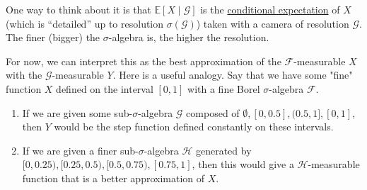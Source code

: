	One way to think about it is that $\mathbb{E}[X \mid \mathcal{G}]$ is the \hyperref[def:cond-exp]{conditional expectation} of $X$ (which is ``detailed'' up to resolution $\sigma(\mathcal{G})$) taken with a camera of resolution $\mathcal{G}$. The finer (bigger) the $\sigma$-algebra is, the higher the resolution. 

	For now, we can interpret this as the best approximation of the $\mathcal{F}$-measurable $X$ with the $\mathcal{G}$-measurable $Y$. Here is a useful analogy. Say that we have some "fine" function $X$ defined on the interval $[0, 1]$ with a fine Borel $\sigma$-algebra $\mathcal{F}$. 
  \begin{enumerate}
    \item If we are given some sub-$\sigma$-algebra $\mathcal{G}$ composed of $\emptyset, [0, 0.5], (0.5, 1], [0, 1]$, then $Y$ would be the step function defined constantly on these intervals. 
    \item If we are given a finer sub-$\sigma$-algebra $\mathcal{H}$ generated by $[0, 0.25), [0.25, 0.5), [0.5, 0.75), [0.75, 1]$, then this would give a $\mathcal{H}$-measurable function that is a better approximation of $X$. 
  \end{enumerate}

